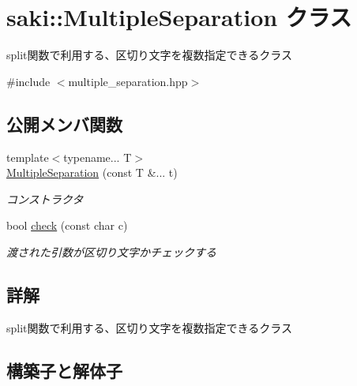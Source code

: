 \hypertarget{classsaki_1_1_multiple_separation}{}\section{saki\+:\+:Multiple\+Separation クラス}
\label{classsaki_1_1_multiple_separation}


split関数で利用する、区切り文字を複数指定できるクラス  




{\ttfamily \#include $<$multiple\+\_\+separation.\+hpp$>$}

\subsection*{公開メンバ関数}
\begin{DoxyCompactItemize}
\item 
{\footnotesize template$<$typename... T$>$ }\\\mbox{\hyperlink{classsaki_1_1_multiple_separation_a675790ff761017d604ecf0e56edb79aa}{Multiple\+Separation}} (const T \&... t)
\begin{DoxyCompactList}\small\item\em コンストラクタ \end{DoxyCompactList}\item 
bool \mbox{\hyperlink{classsaki_1_1_multiple_separation_a27725149daca02b021edf69c58bbe140}{check}} (const char c)
\begin{DoxyCompactList}\small\item\em 渡された引数が区切り文字かチェックする \end{DoxyCompactList}\end{DoxyCompactItemize}


\subsection{詳解}
split関数で利用する、区切り文字を複数指定できるクラス 

\subsection{構築子と解体子}
\mbox{\label{classsaki_1_1_multiple_separation_a675790ff761017d604ecf0e56edb79aa}} 
